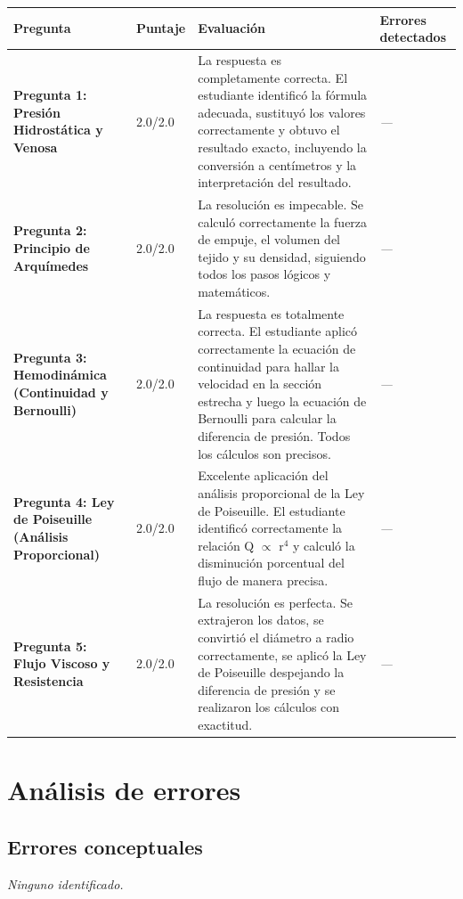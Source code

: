 \documentclass[11pt,a4paper]{article}
\begin{document}
\begin{longtable}{>{\bfseries}p{2.8cm} p{1.6cm} p{7.0cm} p{2.8cm}}
  \toprule
  \textbf{Pregunta} & \textbf{Puntaje} & \textbf{Evaluación} & \textbf{Errores detectados} \\
  \midrule
  \endhead
  \bottomrule
  \endfoot
    \textbf{Pregunta 1: Presión Hidrostática y Venosa} & 2.0/2.0 & La respuesta es completamente correcta. El estudiante identificó la fórmula adecuada, sustituyó los valores correctamente y obtuvo el resultado exacto, incluyendo la conversión a centímetros y la interpretación del resultado. & \textit{---} \\
    \midrule
    \textbf{Pregunta 2: Principio de Arquímedes} & 2.0/2.0 & La resolución es impecable. Se calculó correctamente la fuerza de empuje, el volumen del tejido y su densidad, siguiendo todos los pasos lógicos y matemáticos. & \textit{---} \\
    \midrule
    \textbf{Pregunta 3: Hemodinámica (Continuidad y Bernoulli)} & 2.0/2.0 & La respuesta es totalmente correcta. El estudiante aplicó correctamente la ecuación de continuidad para hallar la velocidad en la sección estrecha y luego la ecuación de Bernoulli para calcular la diferencia de presión. Todos los cálculos son precisos. & \textit{---} \\
    \midrule
    \textbf{Pregunta 4: Ley de Poiseuille (Análisis Proporcional)} & 2.0/2.0 & Excelente aplicación del análisis proporcional de la Ley de Poiseuille. El estudiante identificó correctamente la relación Q $\propto$ r$^{4}$ y calculó la disminución porcentual del flujo de manera precisa. & \textit{---} \\
    \midrule
    \textbf{Pregunta 5: Flujo Viscoso y Resistencia} & 2.0/2.0 & La resolución es perfecta. Se extrajeron los datos, se convirtió el diámetro a radio correctamente, se aplicó la Ley de Poiseuille despejando la diferencia de presión y se realizaron los cálculos con exactitud. & \textit{---} \\
    \midrule
\end{longtable}

\section*{Análisis de errores}

\subsection*{Errores conceptuales}
\textit{Ninguno identificado.}
\end{document}
